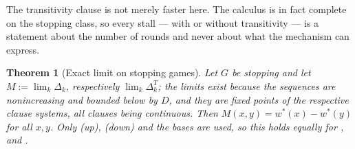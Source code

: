 \documentclass[11pt]{article}
\theoremstyle{plain}
\newtheorem{theorem}{Theorem}[section]
\theoremstyle{definition}
\begin{document}
The transitivity clause is not merely faster here. The calculus is in
fact complete on the stopping class, so every stall --- with or without
transitivity --- is a statement about the number of rounds and never
about what the mechanism can express.

\begin{theorem}[Exact limit on stopping games]\label{thm:trans-complete}
Let $G$ be stopping and let $M:=\lim_k\Delta_k$, respectively
$\lim_k\Delta^{T}_k$; the limits exist because the sequences are
nonincreasing and bounded below by $D$, and they are fixed points of the
respective clause systems, all clauses being continuous. Then
$M(x,y)=w^\ast(x)-w^\ast(y)$ for all $x,y$. Only \emph{(up)},
\emph{(down)} and the bases are used, so this holds equally for
,  and .
\end{theorem}
\end{document}
